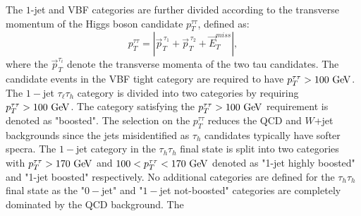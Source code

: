 The $1$-jet and VBF categories are further divided according to the transverse momentum of the Higgs boson candidate $p_{T}^{\tau\tau}$, defined as: 
\begin{equation} \label{eq:hpt}
p_{T}^{\tau\tau} = |\vec{p}_{T}^{\,\tau_1} + \vec{p}_{T}^{\,\tau_2} + \vec{E}_{T}^{miss}|,
\end{equation}
where the $\vec{p}_{T}^{\tau_i}$ denote the transverse momenta of the two tau candidates. The candidate events in the VBF tight category are required to have $p_{T}^{\tau\tau}>100~\mathrm{Ge\kern -0.1em V}$. The $1-$jet $\tau_{\ell}\tau_h$ category is divided into two categories by requiring $p_{T}^{\tau\tau}>100~\mathrm{Ge\kern -0.1em V}$. The category satisfying the $p_{T}^{\tau\tau}>100~\mathrm{Ge\kern -0.1em V}$ requirement is denoted as "boosted". The selection on the $p_{T}^{\tau\tau}$ reduces the QCD and $W$+jet backgrounds since the jets misidentified as $\tau_h$ candidates typically have softer specra. The $1-$jet category in the $\tau_h\tau_h$ final state is split into two categories with $p_{T}^{\tau\tau}>170~\mathrm{Ge\kern -0.1em V}$ and $100<p_{T}^{\tau\tau}<170~\mathrm{Ge\kern -0.1em V}$ denoted as "1-jet highly boosted" and "1-jet boosted" respectively.  No additional categories are defined for the  $\tau_h\tau_h$ final state as the "$0-$jet" and "$1-$jet not-boosted" categories are completely dominated by the QCD background. The   

